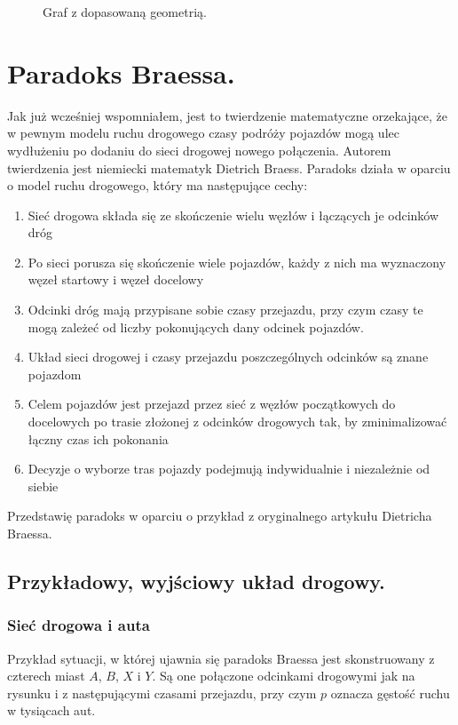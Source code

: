 \documentclass[twoside,12pt]{report}
\begin{document}
\begin{figure}[h]
\begin{flushright}
\begin{minipage}[]{.45\textwidth}
	\caption{Graf z dopasowaną geometrią.}
	\end{minipage}
\end{flushright}
\end{figure}

\section{Paradoks Braessa.}

Jak już wcześniej wspomniałem, jest to twierdzenie matematyczne orzekające, że w pewnym modelu ruchu drogowego czasy podróży pojazdów mogą ulec wydłużeniu po dodaniu do sieci drogowej nowego połączenia. Autorem twierdzenia jest niemiecki matematyk Dietrich Braess\cite{braess}. Paradoks działa w oparciu o model ruchu drogowego, który ma następujące cechy:

\begin{enumerate}
\item Sieć drogowa składa się ze skończenie wielu węzłów i łączących je odcinków dróg
\item Po sieci porusza się skończenie wiele pojazdów, każdy z nich ma wyznaczony węzeł startowy i węzeł docelowy
\item Odcinki dróg mają przypisane sobie czasy przejazdu, przy czym czasy te mogą zależeć od liczby pokonujących dany odcinek pojazdów.
\item Układ sieci drogowej i czasy przejazdu poszczególnych odcinków są znane pojazdom
\item Celem pojazdów jest przejazd przez sieć z węzłów początkowych do docelowych po trasie złożonej z odcinków drogowych tak, by zminimalizować łączny czas ich pokonania
\item Decyzje o wyborze tras pojazdy podejmują indywidualnie i niezależnie od siebie
\end{enumerate}
Przedstawię paradoks w oparciu o przykład z oryginalnego artykułu Dietricha Braessa\cite{paradox}.

\subsection{Przykładowy, wyjściowy układ drogowy.}
\subsubsection{Sieć drogowa i auta}

Przykład sytuacji, w której ujawnia się paradoks Braessa jest skonstruowany z czterech miast $A$, $B$, $X$ i $Y$. Są one połączone odcinkami drogowymi jak na rysunku i z następującymi czasami przejazdu, przy czym $p$ oznacza gęstość ruchu w tysiącach aut.
\end{document}
